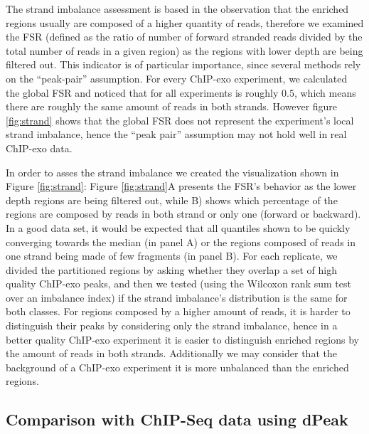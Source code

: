 \documentclass{bmcart}\usepackage[]{graphicx}\usepackage[]{color}
\begin{document}
The strand imbalance assessment is based in the observation that the
enriched regions usually are composed of a higher quantity of reads,
therefore we examined the FSR (defined as the ratio of number of
forward stranded reads divided by the total number of reads in a given
region) as the regions with lower depth are being filtered out. This
indicator is of particular importance, since several methods rely on
the ``peak-pair'' assumption. For every ChIP-exo experiment, we
calculated the global FSR and noticed that for all experiments is
roughly $0.5$, which means there are roughly the same amount of reads
in both strands. However figure \ref{fig:strand} shows that the global
FSR does not represent the experiment's local strand imbalance, hence
the ``peak pair'' assumption may not hold well in real ChIP-exo data.

In order to asses the strand imbalance we created the visualization
shown in Figure \ref{fig:strand}: Figure \ref{fig:strand}A presents
the FSR's behavior as the lower depth regions are being filtered out,
while B) shows which percentage of the regions are composed by reads
in both strand or only one (forward or backward). In a good data set,
it would be expected that all quantiles shown to be quickly converging
towards the median (in panel A) or the regions composed of reads in
one strand being made of few fragments (in panel B). For each
replicate, we divided the partitioned regions by asking whether they
overlap a set of high quality ChIP-exo peaks, and then we tested
(using the Wilcoxon rank sum test over an imbalance index) if the
strand imbalance's distribution is the same for both classes. For
regions composed by a higher amount of reads, it is harder to
distinguish their peaks by considering only the strand imbalance,
hence in a better quality ChIP-exo experiment it is easier to
distinguish enriched regions by the amount of reads in both
strands. Additionally we may consider that the background of a
ChIP-exo experiment it is more unbalanced than the enriched regions.

\subsection{Comparison with ChIP-Seq data using dPeak}
\end{document}
